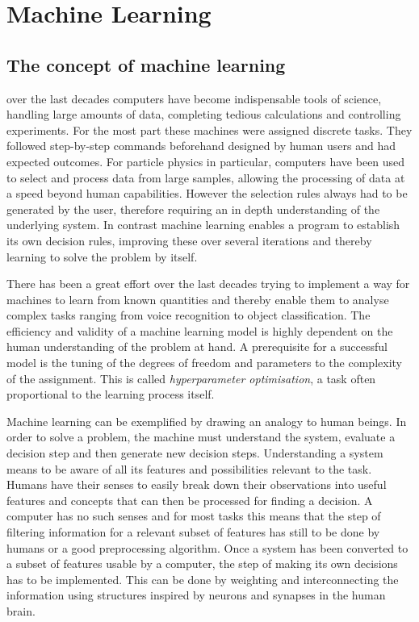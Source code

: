 \chapter{Machine Learning}
\label{chp:ml}

\section{The concept of machine learning}

over the last decades computers have become indispensable tools of science, handling large amounts of data, completing tedious calculations and controlling experiments. For the most part these  machines were assigned discrete tasks. They followed step-by-step commands beforehand designed by human users and had expected outcomes. 
For particle physics in particular, computers have been used to select and process data from large samples, allowing the processing of data at a speed beyond human capabilities. However the selection rules always had to be generated by the user, therefore requiring an in depth understanding of the underlying system. In contrast machine learning enables a program to establish its own decision rules, improving these over several iterations and thereby learning to solve the problem by itself.

There has been a great effort over the last decades trying to implement a way for machines to learn from known quantities and thereby enable them to analyse complex tasks ranging from voice recognition to object classification.
The efficiency and validity of a machine learning model is highly dependent on the human understanding of the problem at hand. A prerequisite for a successful model is the tuning of the degrees of freedom and parameters to the complexity of the assignment. This is called \emph{hyperparameter optimisation}, a task often proportional to the learning process itself.


Machine learning can be exemplified by drawing an analogy to human beings. In order to solve a problem, the machine must understand the system, evaluate a decision step and then generate new decision steps.
Understanding a system means to be aware of all its features and possibilities relevant to the task. Humans have their senses to easily break down their observations into useful features and concepts that can then be processed for finding a decision. A computer has no such senses and for most tasks this means that the step of filtering information for a relevant subset of features has still to be done by humans or a good preprocessing algorithm.
Once a system has been converted to a subset of features usable by a computer, the step of making its own decisions has to be implemented. This can be done by weighting and interconnecting the information using structures inspired by neurons and synapses in the human brain. 


